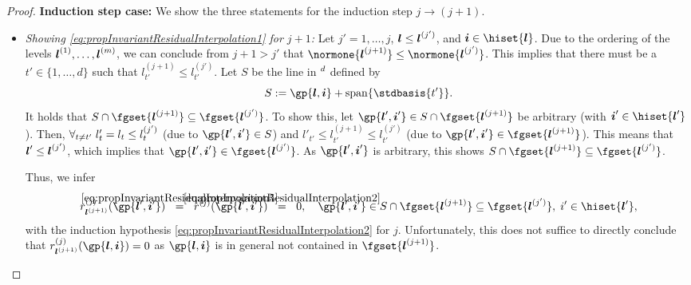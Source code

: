 \begin{proof}
  \noindent
  \textbf{Induction step case:}
  We show the three statements for the induction step $j \to (j + 1)$.
  \begin{itemize}
    \item
    \emph{Showing \eqref{eq:propInvariantResidualInterpolation1} for $j + 1$:}
    Let $j' = 1, \dotsc, j$, ${\boldsymbol{l}} \le {\boldsymbol{l}}^{(j')}$,
    and $\*i \in \hiset{\*l}$.
    Due to the ordering of the levels ${\boldsymbol{l}}^{(1)}, \dotsc, {\boldsymbol{l}}^{(m)}$,
    we can conclude from $j + 1 > j'$ that
    $\normone{\*l^{(j+1)}} \le \normone{\*l^{(j')}}$.
    This implies that there must be a $t' \in \{1, \dotsc, d\}$
    such that $l_{t'}^{(j+1)} \le l_{t'}^{(j')}$.
    Let $S$ be the line in $\real^d$ defined by
    \begin{equation}
      S
      := \gp{\*l,\*i} + \spn\{\stdbasis{t'}\}.
    \end{equation}
    It holds that $S \cap \fgset{\*l^{(j+1)}} \subset \fgset{\*l^{(j')}}$.
    To show this, let $\gp{\*l',\*i'} \in S \cap \fgset{\*l^{(j+1)}}$
    be arbitrary (with $\*i' \in \hiset{\*l'}$).
    Then, $\forall_{t \not= t'}\;l'_t = l_t \le l_t^{(j')}$
    (due to $\gp{\*l',\*i'} \in S$) and
    $l'_{t'} \le l_{t'}^{(j+1)} \le l_{t'}^{(j')}$
    (due to $\gp{\*l',\*i'} \in \fgset{\*l^{(j+1)}}$).
    This means that ${\boldsymbol{l}}' \le {\boldsymbol{l}}^{(j')}$, which implies that
    $\gp{\*l',\*i'} \in \fgset{\*l^{(j')}}$.
    As $\gp{\*l',\*i'}$ is arbitrary,
    this shows $S \cap \fgset{\*l^{(j+1)}} \subset \fgset{\*l^{(j')}}$.
    
    Thus, we infer
    \begin{equation}
      \label{eq:proofPropInvariantResidualInterpolation2}
      r_{\*l^{(j+1)}}^{(j)}(\gp{\*l',\*i'})
      \eqwithref{5}
      r^{(j)}(\gp{\*l',\*i'})
      \eqwithref{2}
      0,\quad
      \gp{\*l',\*i'} \in S \cap \fgset{\*l^{(j+1)}}
      \subset \fgset{\*l^{(j')}},\;
      i' \in \hiset{\*l'},
    \end{equation}
    with the induction hypothesis
    \eqref{eq:propInvariantResidualInterpolation2} for $j$.
    Unfortunately, this does not suffice to directly conclude that
    $r_{\*l^{(j+1)}}^{(j)}(\gp{\*l,\*i}) = 0$ as
    $\gp{\*l,\*i}$ is in general not contained in $\fgset{\*l^{(j+1)}}$.
    

\end{itemize}
\end{proof}
